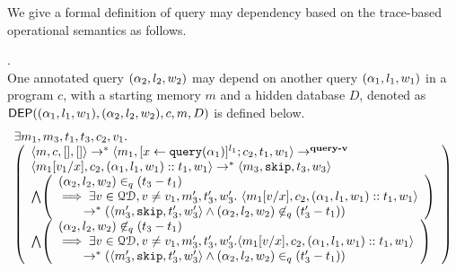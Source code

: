 \documentclass[a4paper,11pt]{article}
\begin{document}
{
   We give a formal definition of query may dependency based on the trace-based operational semantics as follows.
   }
%
% 
%
\begin{defn}
.
\label{def:query_dep}
\\
{
One annotated query $({\alpha}_2,l_2, w_2)$ may depend on another query $({\alpha}_1, l_1, w_1)$ in a program $c$,
with a starting memory $m$ and a hidden database $D$, denoted as 
%
$\mathsf{DEP}({(\alpha_1, l_1, w_1)}, ({\alpha}_2, l_2, w_2), c, m, D)$ is defined below. 
}
{
\[
\begin{array}{l}
\exists m_1,m_3,t_1,t_3,c_2,v_1.\\
  \left (\begin{array}{l}   
\config{m, c, [], []} \rightarrow^{*} 
\config{m_1, [\assign{x}{\query({\qval}_1)}]^{l_1} ; c_2,
  t_1, w_1} 
\rightarrow^{\textbf{query-v}} 
\\ 
\config{m_1[v_1/x], c_2,
({\qval}_1,l_1, w_1)::t_1, w_1} \rightarrow^{*} \config{m_3, \eskip,
t_3,w_3}
 \\ 
 \bigwedge
  \left( 
  \begin{array}{l}
  ({\qval}_2,l_2,w_2) \in_{q} (t_3-t_1) 
  \\
  \implies 
  \exists v \in \qdom, v \neq v_1, m_3', t_3', w_3'. ~  
  \config{m_1[v/x], {c_2}, ({\qval}_1,l_1, w_1)::t_1, w_1} 
  \\ 
  \quad \quad 
  \rightarrow^{*}
  (\config{m_3', \eskip, t_3', w_3'} 
  \land 
  ({\qval}_2,l_2,w_2) \not \in_{q} (t_3'-t_1))
\end{array} \right )
\\
\bigwedge
\left( 
  \begin{array}{l}
	({\qval}_2,l_2,w_2) \not\in_{q} (t_3-t_1)
  	\\
  	\implies 
	\exists v \in \qdom, v \neq v_1, m_3', t_3', w_3'. 
	\config{m_1[v/x], {c_2}, ({\qval}_1,l_1,w_1)::t_1, w_1}
	\\ 
	\quad \quad 
	\rightarrow^{*} 
	(\config{m_3', \eskip, t_3', w_3'} 
	\land 
	({\qval}_2,l_2,w_2)  \in_{q} (t_3'-t_1))
\end{array} \right )
\end{array} \right )
\end{array}
\]
}
\end{defn}
%
%
\end{document}
